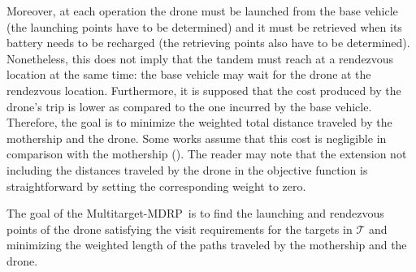 \documentclass{itor}
\theoremstyle{definition}
\theoremstyle{remark}
\def\AMD{{\sf Multitarget-MDRP\xspace}}
\begin{document}
\noindent

% 


Moreover, at each operation the drone must be launched from the base vehicle (the launching points have to be determined) and it must be retrieved when its battery needs to be recharged (the retrieving points also have to be determined). Nonetheless, this does not imply that the tandem must reach at a rendezvous location at the same time: the base vehicle may wait for the drone at the rendezvous location. Furthermore, it is supposed that the cost produced by the drone's trip is lower as compared to the one incurred by the base vehicle. Therefore, the goal is to minimize the weighted total distance traveled by the mothership and the drone. Some works assume that this cost is negligible in comparison with the mothership (\cite{art:Amorosi2021}). The reader may note that the extension not including the distances traveled by the drone in the objective function is straightforward by setting the corresponding weight to zero.
\noindent

The goal of the \AMD \ is to find the launching and rendezvous points of the drone satisfying the visit requirements for the targets in $\mathcal T$ and minimizing the weighted length of the paths traveled by the mothership and the drone. \\

\noindent
\end{document}
